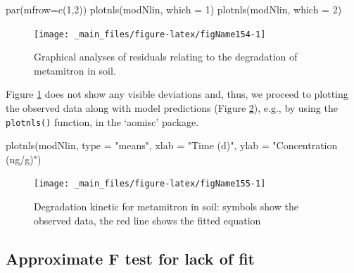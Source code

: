 \documentclass[a4paper,12pt,oneside]{book}
\newenvironment{Shaded}{\begin{snugshade}}{\end{snugshade}}
\newcommand{\DecValTok}[1]{#1}
\newcommand{\StringTok}[1]{#1}
\newcommand{\FunctionTok}[1]{#1}
\newcommand{\AttributeTok}[1]{#1}
\newcommand{\NormalTok}[1]{#1}
\begin{document}
\begin{Shaded}
\begin{Highlighting}[]
\FunctionTok{par}\NormalTok{(}\AttributeTok{mfrow=}\FunctionTok{c}\NormalTok{(}\DecValTok{1}\NormalTok{,}\DecValTok{2}\NormalTok{))}
\FunctionTok{plotnls}\NormalTok{(modNlin, }\AttributeTok{which =} \DecValTok{1}\NormalTok{)}
\FunctionTok{plotnls}\NormalTok{(modNlin, }\AttributeTok{which =} \DecValTok{2}\NormalTok{)}
\end{Highlighting}
\end{Shaded}

\begin{figure}

{\centering \texttt{[image: \_main\_files/figure-latex/figName154-1]} 

}

\caption{Graphical analyses of residuals relating to the degradation of metamitron in soil.}\label{fig:figName154}
\end{figure}

Figure \ref{fig:figName154} does not show any visible deviations and, thus, we proceed to plotting the observed data along with model predictions (Figure \ref{fig:figName155}), e.g., by using the \texttt{plotnls()} function, in the `aomisc' package.

\begin{Shaded}
\begin{Highlighting}[]
\FunctionTok{plotnls}\NormalTok{(modNlin, }\AttributeTok{type =} \StringTok{"means"}\NormalTok{,}
        \AttributeTok{xlab =} \StringTok{"Time (d)"}\NormalTok{, }\AttributeTok{ylab =} \StringTok{"Concentration (ng/g)"}\NormalTok{)}
\end{Highlighting}
\end{Shaded}

\begin{figure}

{\centering \texttt{[image: \_main\_files/figure-latex/figName155-1]} 

}

\caption{Degradation kinetic for metamitron in soil: symbols show the observed data, the red line shows the fitted equation}\label{fig:figName155}
\end{figure}

\hypertarget{approximate-f-test-for-lack-of-fit}{%
\subsection{Approximate F test for lack of fit}\label{approximate-f-test-for-lack-of-fit}}
\end{document}
